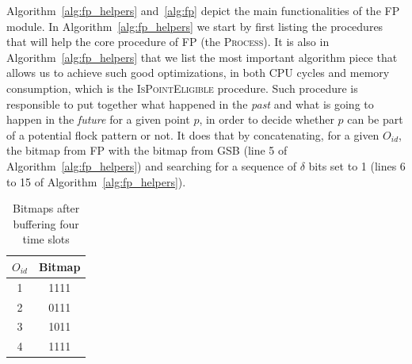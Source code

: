 Algorithm~\ref{alg:fp_helpers} and~\ref{alg:fp} depict the main functionalities of the FP module. In
Algorithm~\ref{alg:fp_helpers} we start by first listing the procedures that will help the core procedure of FP (the
\textsc{Process}). It is also in Algorithm~\ref{alg:fp_helpers} that we list the most important algorithm piece that
allows us to achieve such good optimizations, in both CPU cycles and memory consumption, which is the
\textsc{IsPointEligible} procedure. Such procedure is responsible to put together what happened in the \textit{past} and
what is going to happen in the \textit{future} for a given point $p$, in order to decide whether $p$ can be part of a
potential flock pattern or not. It does that by concatenating, for a given $O_{id}$, the bitmap from FP with the bitmap
from GSB (line 5 of Algorithm~\ref{alg:fp_helpers}) and searching for a sequence of $\delta$ bits set to 1 (lines 6 to
15 of Algorithm~\ref{alg:fp_helpers}).

\begin{table}
    \renewcommand{\arraystretch}{1.3}
    \caption{Bitmaps after buffering four time slots}
    \label{tab:bitmaps}
    \centering
    \begin{tabular}{c|c}
        \hline
        $O_{id}$ &   Bitmap\\
        \hline
        \hline
        1        &   1111\\
        \hline
        2        &   0111\\
        \hline
        3        &   1011\\
        \hline
        4        &   1111\\
        \hline
    \end{tabular}
\end{table}

